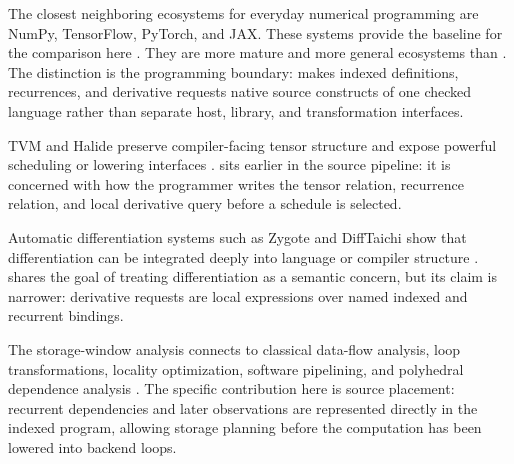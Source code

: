 The closest neighboring ecosystems for everyday numerical programming are
NumPy, TensorFlow, PyTorch, and JAX. These systems provide the baseline for the
comparison here \cite{numpy2020,tensorflow2016,pytorch2019,jax2018}. They are
more mature and more general ecosystems than \einlang{}. The distinction is the
programming boundary: \einlang{} makes indexed definitions, recurrences, and
derivative requests native source constructs of one checked language rather
than separate host, library, and transformation interfaces.

TVM and Halide preserve compiler-facing tensor structure and expose powerful
scheduling or lowering interfaces \cite{tvm2018,halide2013}. \einlang{} sits
earlier in the source pipeline: it is concerned with how the programmer writes
the tensor relation, recurrence relation, and local derivative query before a
schedule is selected.

Automatic differentiation systems such as Zygote and DiffTaichi show that
differentiation can be integrated deeply into language or compiler structure
\cite{zygote2019,difftaichi2020}. \einlang{} shares the goal of treating
differentiation as a semantic concern, but its claim is narrower: derivative
requests are local expressions over named indexed and recurrent bindings.

The storage-window analysis connects to classical data-flow analysis, loop
transformations, locality optimization, software pipelining, and polyhedral
dependence analysis \cite{allen2001optimizing,muchnick1997advanced,lam1988software,rau1994iterative,feautrier1991data,bondhugula2008pluto,bastoul2004code}. The
specific contribution here is source placement: recurrent dependencies and
later observations are represented directly in the indexed program, allowing
storage planning before the computation has been lowered into backend loops.
